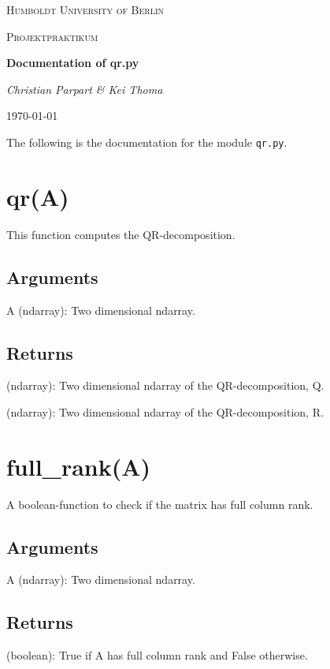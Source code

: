 \documentclass[refman]{article}
\theoremstyle{definition}
\begin{document}
\begin{titlepage}
	\centering
	{\scshape\LARGE Humboldt University of Berlin \par}
	\vspace{1cm}
	{\scshape\Large Projektpraktikum \par}
	\vspace{1.5cm}
	{\huge\bfseries Documentation of qr.py \par}
	\vspace{2cm}
	{\Large\itshape Christian Parpart \& Kei Thoma \par}
	\vfill

	\vfill

	{\large \today\par}
\end{titlepage}

\tableofcontents
\newpage
The following is the documentation for the module \texttt{qr.py}.

\section{qr(A)}
This function computes the QR-decomposition.
\subsection*{Arguments}
A (ndarray): Two dimensional ndarray.
\subsection*{Returns}
(ndarray): Two dimensional ndarray of the QR-decomposition, Q.

(ndarray): Two dimensional ndarray of the QR-decomposition, R.

\section{full\_rank(A)}
A boolean-function to check if the matrix has full column rank.
\subsection*{Arguments}
A (ndarray): Two dimensional ndarray.
\subsection*{Returns}
(boolean): True if A has full column rank and False otherwise.
\end{document}
